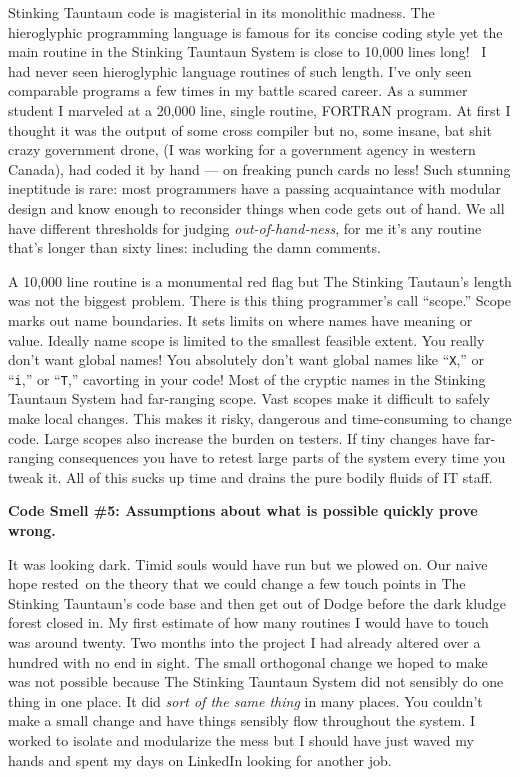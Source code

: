 Stinking Tauntaun code is magisterial in its monolithic madness. The
hieroglyphic programming language is famous for its concise coding style
yet the main routine in the Stinking Tauntaun System is close to 10,000
lines long!~ I had never seen hieroglyphic language routines of such
length. I've only seen comparable programs a few times in my battle
scared career. As a summer student I marveled at a 20,000 line, single
routine, FORTRAN program. At first I thought it was the output of some
cross compiler but no, some insane, bat shit crazy government drone, (I
was working for a government agency in western Canada), had coded it by
hand --- on freaking punch cards no less! Such stunning ineptitude is
rare: most programmers have a passing acquaintance with modular design
and know enough to reconsider things when code gets out of hand. We all
have different thresholds for judging \emph{out-of-hand-ness}, for me
it's any routine that's longer than sixty lines: including the damn
comments.

A 10,000 line routine is a monumental red flag but The Stinking
Tautaun's length was not the biggest problem. There is this thing
programmer's call ``scope.'' Scope marks out name boundaries. It sets
limits on where names have meaning or value. Ideally name scope is
limited to the smallest feasible extent. You really don't want global
names! You absolutely don't want global names like ``\texttt{X},'' or ``\texttt{i},'' or
``\texttt{T},'' cavorting in your code! Most of the cryptic names in the Stinking
Tauntaun System had far-ranging scope. Vast scopes make it difficult to
safely make local changes. This makes it risky, dangerous and
time-consuming to change code. Large scopes also increase the burden on
testers. If tiny changes have far-ranging consequences you have to
retest large parts of the system every time you tweak it. All of this
sucks up time and drains the pure bodily fluids of IT staff.

\medskip
\noindent\textbf{Code Smell \#5: Assumptions about what is possible quickly
prove wrong.}
\medskip


It was looking dark. Timid souls would have run but we plowed on. Our
naive hope rested~on the theory that we could change a few touch points
in The Stinking Tauntaun's code base and then get out of Dodge before
the dark kludge forest closed in. My first estimate of how many routines
I would have to touch was around twenty. Two months into the project I
had already altered over a hundred with no end in sight. The small
orthogonal change we hoped to make was not possible because The Stinking
Tauntaun System did not sensibly do one thing in one place. It did
\emph{sort of the same thing} in many places. You couldn't make a small
change and have things sensibly flow throughout the system. I worked to
isolate and modularize the mess but I should have just waved my hands
and spent my days on LinkedIn looking for another job.

